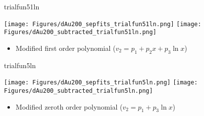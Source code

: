 \documentclass[aspectratio=169,compress,10pt]{beamer}
\begin{document}
\begin{frame}{trialfun51ln}
\begin{center}
\texttt{[image: Figures/dAu200\_sepfits\_trialfun51ln.png]}
\texttt{[image: Figures/dAu200\_subtracted\_trialfun51ln.png]}
\end{center}
\begin{itemize}
\item Modified first order polynomial ($v_2 = p_1 + p_2x + p_3\ln x$)
\end{itemize}
\end{frame}




\begin{frame}{trialfun5ln}
\begin{center}
\texttt{[image: Figures/dAu200\_sepfits\_trialfun5ln.png]}
\texttt{[image: Figures/dAu200\_subtracted\_trialfun5ln.png]}
\end{center}
\begin{itemize}
\item Modified zeroth order polynomial ($v_2 = p_1 + p_3\ln x$)
\end{itemize}
\end{frame}
\end{document}
